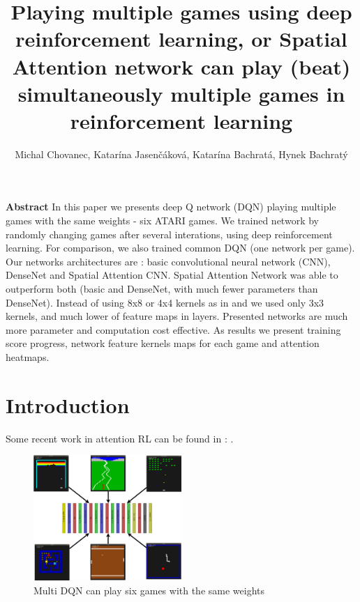 \documentclass[10pt,a4paper]{article}
\begin{document}
\title{Playing multiple games using deep reinforcement learning, or Spatial Attention network can play (beat) simultaneously multiple games in reinforcement learning}
\author{Michal Chovanec, Katarína Jasenčáková, Katarína Bachratá, Hynek Bachratý}
\date{}
\maketitle
\thispagestyle{empty}

{\bf Abstract}
In this paper we presents deep Q network (DQN) playing multiple games with the same weights - six ATARI games.
We trained network by randomly changing games after several interations, using deep reinforcement learning.
For comparison, we also trained common DQN (one network per game). Our networks architectures are : basic convolutional neural network (CNN), DenseNet and Spatial Attention CNN.
Spatial Attention Network was able to outperform both (basic and DenseNet, with much fewer parameters than DenseNet).
Instead of using 8x8 or 4x4 kernels as in \cite{bib:dqn_atari} and \cite{bib:dqn_doom}  we used only 3x3 kernels, and much lower of feature maps in layers.
Presented networks are much more parameter and computation cost effective. As results we present training score progress, network feature kernels maps for each game and attention heatmaps.


\section{Introduction}

Some recent work in attention RL can be found in :\cite{bib:rl_attention_multi_focus} \cite{bib:rl_attention} \cite{bib:rl_attention_multi_view}.


\begin{figure}[htb!]
\centering
\includegraphics[width=0.5\textwidth]{diagrams/multi_dqn.png}
\caption{Multi DQN can play six games with the same weights}

\end{figure}
\end{document}
